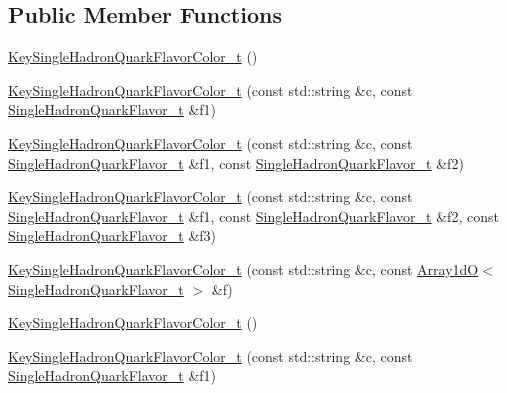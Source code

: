 \subsection*{Public Member Functions}
\begin{DoxyCompactItemize}
\item 
\mbox{\hyperlink{structHadron_1_1KeySingleHadronQuarkFlavorColor__t_acd4b45c7be8c3465db55bcddff1c4617}{Key\+Single\+Hadron\+Quark\+Flavor\+Color\+\_\+t}} ()
\item 
\mbox{\hyperlink{structHadron_1_1KeySingleHadronQuarkFlavorColor__t_ab47ad45a431348bc0ac3c90a670a440a}{Key\+Single\+Hadron\+Quark\+Flavor\+Color\+\_\+t}} (const std\+::string \&c, const \mbox{\hyperlink{structHadron_1_1SingleHadronQuarkFlavor__t}{Single\+Hadron\+Quark\+Flavor\+\_\+t}} \&f1)
\item 
\mbox{\hyperlink{structHadron_1_1KeySingleHadronQuarkFlavorColor__t_a1a1acbb421e0eee78a6102a9dc7027b6}{Key\+Single\+Hadron\+Quark\+Flavor\+Color\+\_\+t}} (const std\+::string \&c, const \mbox{\hyperlink{structHadron_1_1SingleHadronQuarkFlavor__t}{Single\+Hadron\+Quark\+Flavor\+\_\+t}} \&f1, const \mbox{\hyperlink{structHadron_1_1SingleHadronQuarkFlavor__t}{Single\+Hadron\+Quark\+Flavor\+\_\+t}} \&f2)
\item 
\mbox{\hyperlink{structHadron_1_1KeySingleHadronQuarkFlavorColor__t_aa59b67de7070dc5fcab6ef768af7069e}{Key\+Single\+Hadron\+Quark\+Flavor\+Color\+\_\+t}} (const std\+::string \&c, const \mbox{\hyperlink{structHadron_1_1SingleHadronQuarkFlavor__t}{Single\+Hadron\+Quark\+Flavor\+\_\+t}} \&f1, const \mbox{\hyperlink{structHadron_1_1SingleHadronQuarkFlavor__t}{Single\+Hadron\+Quark\+Flavor\+\_\+t}} \&f2, const \mbox{\hyperlink{structHadron_1_1SingleHadronQuarkFlavor__t}{Single\+Hadron\+Quark\+Flavor\+\_\+t}} \&f3)
\item 
\mbox{\hyperlink{structHadron_1_1KeySingleHadronQuarkFlavorColor__t_aa894166327f6565a8ec49fd863dadf47}{Key\+Single\+Hadron\+Quark\+Flavor\+Color\+\_\+t}} (const std\+::string \&c, const \mbox{\hyperlink{classADAT_1_1Array1dO}{Array1dO}}$<$ \mbox{\hyperlink{structHadron_1_1SingleHadronQuarkFlavor__t}{Single\+Hadron\+Quark\+Flavor\+\_\+t}} $>$ \&f)
\item 
\mbox{\hyperlink{structHadron_1_1KeySingleHadronQuarkFlavorColor__t_acd4b45c7be8c3465db55bcddff1c4617}{Key\+Single\+Hadron\+Quark\+Flavor\+Color\+\_\+t}} ()
\item 
\mbox{\hyperlink{structHadron_1_1KeySingleHadronQuarkFlavorColor__t_ab47ad45a431348bc0ac3c90a670a440a}{Key\+Single\+Hadron\+Quark\+Flavor\+Color\+\_\+t}} (const std\+::string \&c, const \mbox{\hyperlink{structHadron_1_1SingleHadronQuarkFlavor__t}{Single\+Hadron\+Quark\+Flavor\+\_\+t}} \&f1)

\end{DoxyCompactItemize}
